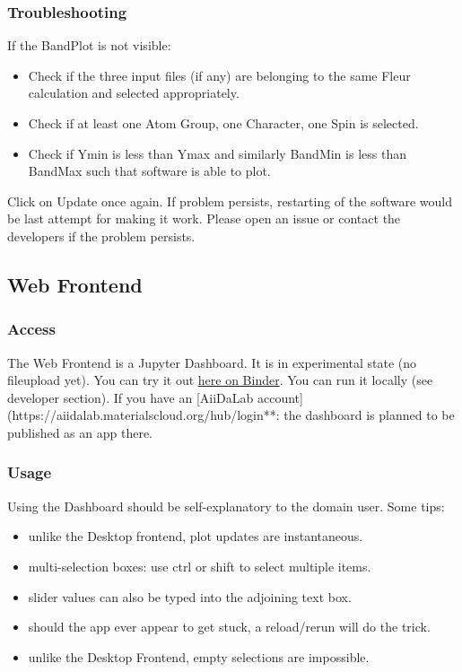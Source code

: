 \subsubsection{Troubleshooting}\label{troubleshooting}

If the BandPlot is not visible:

\begin{itemize}
\tightlist
\item
  Check if the three input files (if any) are belonging to the same
  Fleur calculation and selected appropriately.
\item
  Check if at least one Atom Group, one Character, one Spin is selected.
\item
  Check if Ymin is less than Ymax and similarly BandMin is less than
  BandMax such that software is able to plot.
\end{itemize}

Click on Update once again. If problem persists, restarting of the
software would be last attempt for making it work. Please open an issue
or contact the developers if the problem persists.

\subsection{Web Frontend}\label{web-frontend}

\subsubsection{Access}\label{access}

The Web Frontend is a Jupyter Dashboard. It is in experimental state (no
fileupload yet). You can try it out
\href{https://mybinder.org/v2/gh/JuDFTteam/masci-tools/studentproject18ws?filepath=studentproject18w\%2Ffrontend\%2Fjupyter\%2Fdemo\%2Fbinder_demo.ipynb}{here
on Binder}. You can run it locally (see developer section). If you have
an {[}AiiDaLab
account{]}(https://aiidalab.materialscloud.org/hub/login**: the
dashboard is planned to be published as an app there.

\subsubsection{Usage}\label{usage-1}

Using the Dashboard should be self-explanatory to the domain user. Some
tips:

\begin{itemize}
\tightlist
\item
  unlike the Desktop frontend, plot updates are instantaneous.
\item
  multi-selection boxes: use ctrl or shift to select multiple items.
\item
  slider values can also be typed into the adjoining text box.
\item
  should the app ever appear to get stuck, a reload/rerun will do the
  trick.
\item
  unlike the Desktop Frontend, empty selections are impossible.
\end{itemize}

